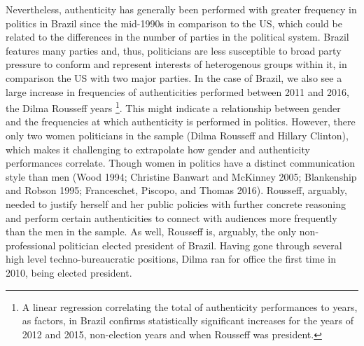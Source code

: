 \documentclass[smallextended]{svjour3}       %
\begin{document}
Nevertheless, authenticity has generally been performed with greater
frequency in politics in Brazil since the mid-1990s in comparison to the
US, which could be related to the differences in the number of parties
in the political system. Brazil features many parties and, thus,
politicians are less susceptible to broad party pressure to conform and
represent interests of heterogenous groups within it, in comparison the
US with two major parties. In the case of Brazil, we also see a large
increase in frequencies of authenticities performed between 2011 and
2016, the Dilma Rousseff years \footnote{ A linear regression
  correlating the total of authenticity performances to years, as
  factors, in Brazil confirms statistically significant increases for
  the years of 2012 and 2015, non-election years and when Rousseff was
  president.}. This might indicate a relationship between gender and the
frequencies at which authenticity is performed in politics. However,
there only two women politicians in the sample (Dilma Rousseff and
Hillary Clinton), which makes it challenging to extrapolate how gender
and authenticity performances correlate. Though women in politics have a
distinct communication style than men (Wood 1994; Christine Banwart and
McKinney 2005; Blankenship and Robson 1995; Franceschet, Piscopo, and
Thomas 2016). Rousseff, arguably, needed to justify herself and her
public policies with further concrete reasoning and perform certain
authenticities to connect with audiences more frequently than the men in
the sample. As well, Rousseff is, arguably, the only non-professional
politician elected president of Brazil. Having gone through several high
level techno-bureaucratic positions, Dilma ran for office the first time
in 2010, being elected president.
\end{document}
